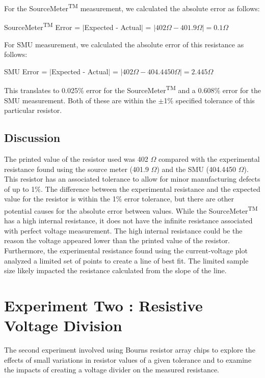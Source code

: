 \documentclass{article}
\begin{document}
For the SourceMeter\textsuperscript{TM} measurement, we calculated the absolute error as follows:

\begin{center}
    SourceMeter\textsuperscript{TM} Error = $|$Expected - Actual$|$ = $|402\Omega - 401.9\Omega| = 0.1\Omega$
\end{center}

For SMU measurement, we calculated the absolute error of this resistance as follows:

\begin{center}
    SMU Error = $|$Expected - Actual$|$ = $|402\Omega - 404.4450\Omega| = 2.445\Omega$
\end{center}

This translates to 0.025\% error for the SourceMeter\textsuperscript{TM} and a 0.608$\%$ error for the SMU measurement. Both of these are within the $\pm$1$\%$ specified tolerance of this particular resistor.

\subsection{Discussion}
The printed value of the resistor used was 402 $\Omega$ compared with the experimental resistance found using the source meter (401.9 $\Omega$) and the SMU (404.4450 $\Omega$). This resistor has an associated tolerance to allow for minor manufacturing defects of up to 1$\%$.  The difference between the experimental resistance and the expected value for the resistor is within the 1$\%$ error tolerance, but there are other potential causes for the absolute error between values. While the SourceMeter\textsuperscript{TM} has a high internal resistance, it does not have the infinite resistance associated with perfect voltage measurement. The high internal resistance could be the reason the voltage appeared lower than the printed value of the resistor.  Furthermore, the experimental resistance found using the current-voltage plot analyzed a limited set of points to create a line of best fit. The limited sample size likely impacted the resistance calculated from the slope of the line.  

\section{Experiment Two : Resistive Voltage Division}
The second experiment involved using Bourns resistor array chips to explore the effects of small variations in resistor values of a given tolerance and to examine the impacts of creating a voltage divider on the measured resistance. 
\end{document}
